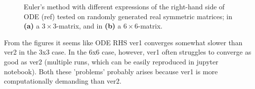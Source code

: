 \begin{figure}[H]
\centering
{}
\qquad
{}
\caption{Euler's method with different expressions of the right-hand side of ODE (ref) tested on randomly generated real symmetric matrices; in \textbf{(a)} a $3\times 3$-matrix, and in \textbf{(b)} a $6\times 6$-matrix.}
\label{fig:euler_benchmark}
\end{figure}

From the figures it seems like ODE RHS ver1 converges somewhat slower than ver2 in the 3x3 case. In the 6x6 case, however, ver1 often struggles to converge as good as ver2 (multiple runs, which can be easily reproduced in jupyter notebook). Both these 'problems' probably arises because ver1 is more computationally demanding than ver2.

